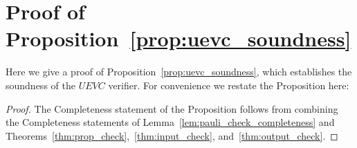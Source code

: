 \section{Proof of Proposition~\ref{prop:uevc_soundness}}
\label{sec:soundness}

Here we give a proof of Proposition~\ref{prop:uevc_soundness}, which establishes the soundness of the $UEVC$ verifier. For convenience we restate the Proposition here:

\soundness*

\begin{proof}
	
	The Completeness statement of the Proposition follows from combining the Completeness statements of Lemma~\ref{lem:pauli_check_completeness} and Theorems~\ref{thm:prop_check},~\ref{thm:input_check}, and~\ref{thm:output_check}.
	
	
\end{proof}